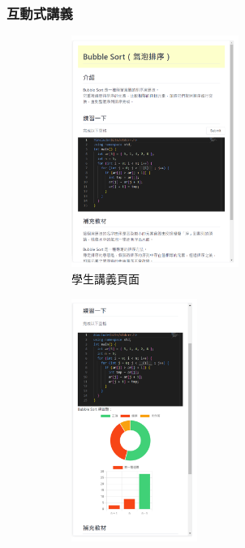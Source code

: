 
\subsubsection{互動式講義}

\begin{figure}[H]
  \begin{subfigure}{0.5\linewidth}
    \centering
    \includegraphics[width=0.6\textwidth]{images/side-s.png}
    \caption{學生講義頁面}
    \label{fig:student}
  \end{subfigure}
  \begin{subfigure}{0.5\linewidth}
    \centering
    \includegraphics[width=0.45\textwidth]{images/side-t.png}

\end{subfigure}
\end{figure}

